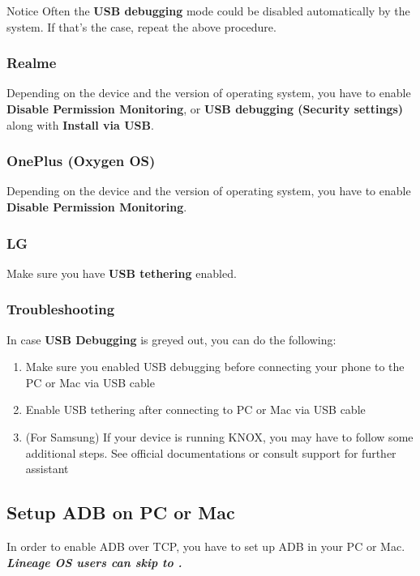 \begin{tip}{Notice}
    Often the \textbf{USB debugging} mode could be disabled automatically by the system. If that's the case, repeat the
    above procedure.
\end{tip}

\subsubsection{Realme} %
Depending on the device and the version of operating system, you have to enable \textbf{Disable Permission Monitoring},
or \textbf{USB debugging (Security settings)} along with \textbf{Install via USB}.

\subsubsection{OnePlus (Oxygen OS)} %
Depending on the device and the version of operating system, you have to enable \textbf{Disable Permission Monitoring}.

\subsubsection{LG} %
Make sure you have \textbf{USB tethering} enabled.

\subsubsection{Troubleshooting} %
In case \textbf{USB Debugging} is greyed out, you can do the following:
\begin{enumerate}
    \item Make sure you enabled USB debugging before connecting your phone to the PC or Mac via USB cable
    \item Enable USB tethering after connecting to PC or Mac via USB cable
    \item (For Samsung) If your device is running KNOX, you may have to follow some additional steps. See official
    documentations or consult support for further assistant
\end{enumerate}

\subsection{Setup ADB on PC or Mac}\label{subsec:setup-adb-on-pc-or-mac} %
In order to enable ADB over TCP, you have to set up ADB in your PC or Mac. \textbf{\textit{Lineage OS users can skip to
.}}

